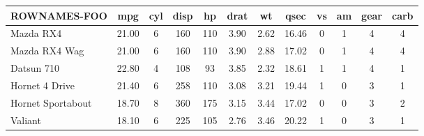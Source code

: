 \begin{tabular}{lccccccccccc}
\hline
\textbf{ROWNAMES-FOO} & \textbf{mpg} & \textbf{cyl} & \textbf{disp} & \textbf{hp} & \textbf{drat} & \textbf{wt} & \textbf{qsec} & \textbf{vs} & \textbf{am} & \textbf{gear} & \textbf{carb} \\
\hline
Mazda RX4 & 21.00 & 6 & 160 & 110 & 3.90 & 2.62 & 16.46 & 0 & 1 & 4 & 4\\
Mazda RX4 Wag & 21.00 & 6 & 160 & 110 & 3.90 & 2.88 & 17.02 & 0 & 1 & 4 & 4\\
Datsun 710 & 22.80 & 4 & 108 & 93 & 3.85 & 2.32 & 18.61 & 1 & 1 & 4 & 1\\
Hornet 4 Drive & 21.40 & 6 & 258 & 110 & 3.08 & 3.21 & 19.44 & 1 & 0 & 3 & 1\\
Hornet Sportabout & 18.70 & 8 & 360 & 175 & 3.15 & 3.44 & 17.02 & 0 & 0 & 3 & 2\\
Valiant & 18.10 & 6 & 225 & 105 & 2.76 & 3.46 & 20.22 & 1 & 0 & 3 & 1\\
\hline
\end{tabular}

